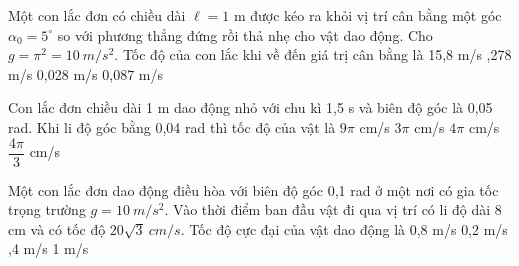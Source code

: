 





\begin{ex} %
Một con lắc đơn có chiều dài $\ell = 1$ m được kéo ra khỏi vị trí cân bằng một góc $\alpha _0=5^\circ$ so với phương thẳng đứng rồi thả nhẹ cho vật dao động. Cho $g=\pi ^2=10\ m/s^2$. Tốc độ của con lắc khi về đến giá trị cân bằng là
\choice
{15,8 m/s}
{,278 m/s}
{0,028 m/s}
{0,087 m/s}
\end{ex} 

\begin{ex}%
Con lắc đơn chiều dài 1 m dao động nhỏ với chu kì 1,5 s và biên độ góc là 0,05 rad. Khi li độ góc bằng 0,04 rad thì tốc độ của vật là
\choice
{$9\pi $ cm/s}
{$3\pi $ cm/s}
{\True $4\pi $ cm/s}
{$\dfrac{4\pi}{3}$ cm/s}
\end{ex} 
\begin{ex} %
Một con lắc đơn dao động điều hòa với biên độ góc 0,1 rad ở một nơi có gia tốc trọng trường $g = 10\ m/s^2$. Vào thời điểm ban đầu vật đi qua vị trí có li độ dài 8 cm và có tốc độ $20\sqrt{3}\ cm/s$. Tốc độ cực đại của vật dao động là
\choice
{0,8 m/s}
{0,2 m/s}
{,4 m/s}
{1 m/s}
\end{ex} 
